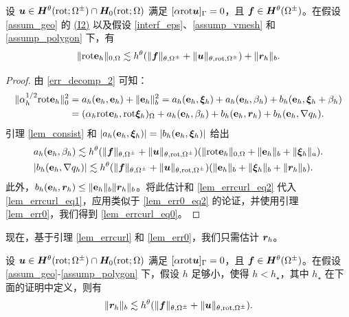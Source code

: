 \begin{lemma}
\label{lem_errcurl}
设 $\boldsymbol{u}\in \boldsymbol{H}^{\theta}(\mathrm{rot};\Omega^{\pm})\cap \boldsymbol{H}_0(\mathrm{rot};\Omega)$ 满足 $[\alpha \mathrm{rot} \boldsymbol{u}]_{\Gamma} = 0$，且 $\boldsymbol{f}\in \boldsymbol{H}^{\theta}(\Omega^{\pm}) $。在假设 \ref{assum_geo} 的 \hyperref[asp:I2]{(I2)} 以及假设 \ref{interf_eps}、\ref{assump_vmesh} 和 \ref{assump_polygon} 下，有
\begin{equation}
\label{lem_errcurl_eq0}
\| \mathrm{rot} \mathbf{e}_h \|_{0,\Omega} \lesssim h^{\theta} ( \| \boldsymbol{f} \|_{\theta,\Omega^{\pm}} + \| \boldsymbol{u} \|_{\theta,\mathrm{rot},\Omega^{\pm}})   +  \| \boldsymbol{r}_h \|_b.
\end{equation}
\end{lemma}
\begin{proof}
由 \eqref{err_decomp_2} 可知：
\begin{equation}
\begin{split}
\label{lem_errcurl_eq1}
\| \alpha^{1/2}_h \mathrm{rot} \mathbf{e}_h \|^2_0 &= a_h(\mathbf{e}_h,\mathbf{e}_h) + \| \mathbf{e}_h \|^2_{b}  = a_h(\mathbf{e}_h, \boldsymbol{\xi}_h) + a_h(\mathbf{e}_h,\beta_h) + b_h(\mathbf{e}_h,\boldsymbol{\xi}_h+\beta_h) \\
& = (\alpha_h \mathrm{rot} \mathbf{e}_h, \mathrm{rot} \boldsymbol{\xi}_h)_{\Omega} +  a_h(\mathbf{e}_h,\beta_h)  + b_h(\mathbf{e}_h,\boldsymbol{r}_h)  + b_h(\mathbf{e}_h, \nabla q_h).
\end{split}
\end{equation}
引理 \ref{lem_consist} 和 $|a_h(\mathbf{e}_h,\boldsymbol{\xi}_h)| = |b_h(\mathbf{e}_h,\boldsymbol{\xi}_h)|$ 给出
\begin{subequations}
\label{lem_errcurl_eq2}
\begin{align}
&  a_h(\mathbf{e}_h,\beta_h) \lesssim  h^{\theta}
(\| \boldsymbol{f} \|_{\theta,\Omega^{\pm}}+ \| \boldsymbol{u} \|_{\theta,\mathrm{rot},\Omega^{\pm}})
( \| \mathrm{rot} \mathbf{e}_h \|_{0,\Omega} + \| \mathbf{e}_h \|_{b} + \| \boldsymbol{\xi}_h \|_{a} ). \\
&  |b_h(\mathbf{e}_h, \nabla q_h)| \lesssim  h^{\theta}
(\| \boldsymbol{f} \|_{\theta,\Omega^{\pm}} + \| \boldsymbol{u} \|_{\theta,\mathrm{rot},\Omega^{\pm}})
( \| \mathbf{e}_h \|_b + \| \boldsymbol{\xi}_h \|_b + \| \boldsymbol{r}_h \|_b  ).
\end{align}
\end{subequations}
此外，$b_h(\mathbf{e}_h,\boldsymbol{r}_h) \le \| \mathbf{e}_h \|_b \| \boldsymbol{r}_h \|_b$。将此估计和 \eqref{lem_errcurl_eq2} 代入 \eqref{lem_errcurl_eq1}，应用类似于 \eqref{lem_err0_eq2} 的论证，并使用引理 \ref{lem_err0}，我们得到 \eqref{lem_errcurl_eq0}。
\end{proof}

现在，基于引理 \ref{lem_errcurl} 和 \ref{lem_err0}，我们只需估计 $\boldsymbol{r}_h$。

\begin{lemma}
\label{lem_rh}
设 $\boldsymbol{u}\in \boldsymbol{H}^{\theta}(\mathrm{rot};\Omega^{\pm})\cap \boldsymbol{H}_0(\mathrm{rot};\Omega)$ 满足 $[\alpha \mathrm{rot} \boldsymbol{u}]_{\Gamma} = 0$，且 $\boldsymbol{f}\in \boldsymbol{H}^{\theta}(\Omega^{\pm})$。在假设 \ref{assum_geo}-\ref{assump_polygon} 下，假设 $h$ 足够小，使得 $h < h_{\star}$，其中 $h_{\star}$ 在下面的证明中定义，则有
\begin{equation}
\label{lem_rh_eq0}
\| \boldsymbol{r}_h \|_b  \lesssim h^{\theta}  ( \| \boldsymbol{f} \|_{\theta,\Omega^{\pm}} + \| \boldsymbol{u} \|_{\theta,\mathrm{rot},\Omega^{\pm}}).
\end{equation}
\end{lemma}


